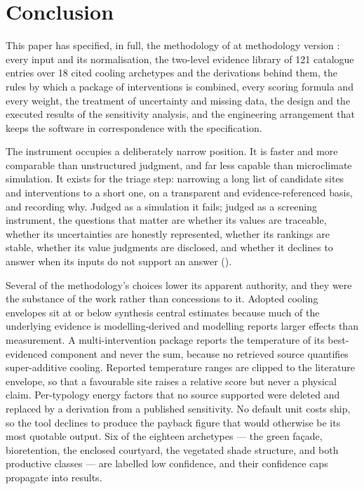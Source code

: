 \section{Conclusion}
\label{sec:conclusion}

This paper has specified, in full, the methodology of \tool{} at methodology
version \methver{}: every input and its normalisation, the two-level evidence
library of \num{121} catalogue entries over \num{18} cited cooling archetypes
and the derivations behind them, the rules by which a package of interventions
is combined, every scoring formula and every weight, the treatment of
uncertainty and missing data, the design and the executed results of the
sensitivity analysis, and the engineering arrangement that keeps the software
in correspondence with the specification.

The instrument occupies a deliberately narrow position. It is faster and more
comparable than unstructured judgment, and far less capable than microclimate
simulation. It exists for the triage step: narrowing a long list of candidate
sites and interventions to a short one, on a transparent and
evidence-referenced basis, and recording why. Judged as a simulation it fails;
judged as a screening instrument, the questions that matter are whether its
values are traceable, whether its uncertainties are honestly represented,
whether its rankings are stable, whether its value judgments are disclosed, and
whether it declines to answer when its inputs do not support an answer
().

Several of the methodology's choices lower its apparent authority, and they
were the substance of the work rather than concessions to it. Adopted cooling
envelopes sit at or below synthesis central estimates because much of the
underlying evidence is modelling-derived and modelling reports larger effects
than measurement. A multi-intervention package reports the temperature of its
best-evidenced component and never the sum, because no retrieved source
quantifies super-additive cooling. Reported temperature ranges are clipped to
the literature envelope, so that a favourable site raises a relative score but
never a physical claim. Per-typology energy factors that no source supported
were deleted and replaced by a derivation from a published sensitivity. No
default unit costs ship, so the tool declines to produce the payback figure
that would otherwise be its most quotable output. Six of the eighteen
archetypes --- the green fa\c{c}ade, bioretention, the enclosed courtyard, the
vegetated shade structure, and both productive classes --- are labelled low
confidence, and their confidence caps propagate into results.

